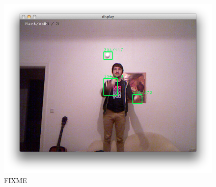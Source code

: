 \documentclass[12pt,a4paper,ngerman]{scrartcl}
\begin{document}
\begin{figure}[H]
    \centering
    \includegraphics[scale=0.5]{img/rects-1.png}
    \vspace{-0.5cm}
    \caption{FIXME}
    \label{rects-1}
\end{figure}
\end{document}
